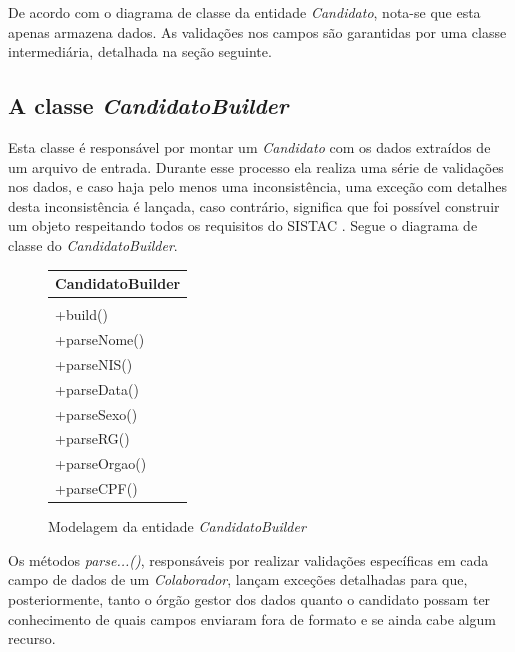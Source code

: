 \documentclass[
	12pt,			%
	openright,		%
	oneside,	
	a4paper,		%
	english,		%
	brazil			%
]{abntex2/abntex2}  %
\begin{document}
	De acordo com o diagrama de classe da entidade \textit{Candidato}, nota-se que esta apenas armazena dados. As validações nos campos são garantidas por uma classe intermediária, detalhada na seção seguinte.
	
	\subsection{A classe \textit{CandidatoBuilder}}
	
	Esta classe é responsável por montar um \textit{Candidato} com os dados extraídos de um arquivo de entrada. Durante esse processo ela realiza uma série de validações nos dados, e caso haja pelo menos uma inconsistência, uma exceção com detalhes desta inconsistência é lançada, caso contrário, significa que foi possível construir um objeto respeitando todos os requisitos do SISTAC \cite{sistac-formatos}. Segue o diagrama de classe do \textit{CandidatoBuilder}.
	
	\begin{figure}[H]
		\begin{center}
			
			\caption{Modelagem da entidade \textit{CandidatoBuilder}}
			\label{candidatobuilder-uml}
			
			\begin{tabular}{|l|}
				\hline
				\multicolumn{1}{|c|}{\textbf{CandidatoBuilder}} \\ \hline
				\\ \hline
				+build() \\
				+parseNome() \\
				+parseNIS() \\
				+parseData() \\
				+parseSexo() \\
				+parseRG() \\
				+parseOrgao() \\
				+parseCPF() \\ \hline
			\end{tabular}
		
		\end{center}
	\end{figure}
	
	Os métodos \textit{parse...()}, responsáveis por realizar validações específicas em cada campo de dados de um \textit{Colaborador}, lançam exceções detalhadas para que, posteriormente, tanto o órgão gestor dos dados quanto o candidato possam ter conhecimento de quais campos enviaram fora de formato e se ainda cabe algum recurso.
	
\end{document}
